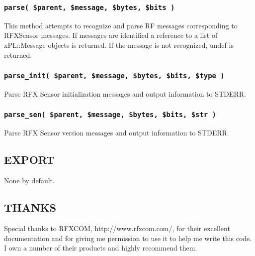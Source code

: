 \subsubsection*{\texttt{parse( \$parent, \$message, \$bytes, \$bits )}\label{xPL::RF::RFXSensor_parse_parent_message_bytes_bits_}}


This method attempts to recognize and parse RF messages corresponding
to RFXSensor messages.  If messages are identified a reference to a
list of xPL::Message objects is returned.  If the message is not
recognized, undef is returned.

\subsubsection*{\texttt{parse\_init( \$parent, \$message, \$bytes, \$bits, \$type )}\label{xPL::RF::RFXSensor_parse_init_parent_message_bytes_bits_type_}}


Parse RFX Sensor initialization messages and output information to STDERR.

\subsubsection*{\texttt{parse\_sen( \$parent, \$message, \$bytes, \$bits, \$str )}\label{xPL::RF::RFXSensor_parse_sen_parent_message_bytes_bits_str_}}


Parse RFX Sensor version messages and output information to STDERR.

\subsection*{EXPORT\label{xPL::RF::RFXSensor_EXPORT}}


None by default.

\subsection*{THANKS\label{xPL::RF::RFXSensor_THANKS}}


Special thanks to RFXCOM, \textsf{http://www.rfxcom.com/}, for their
excellent documentation and for giving me permission to use it to help
me write this code.  I own a number of their products and highly
recommend them.

